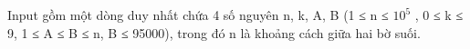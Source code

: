 Input gồm một dòng duy nhất chứa 4 số nguyên n, k, A, B (1 ≤ n ≤ $10^{5}$   , 0 ≤ k ≤ 9, 1 ≤ A ≤ B ≤ n, B ≤ 95000), trong đó n là khoảng cách giữa hai bờ suối.